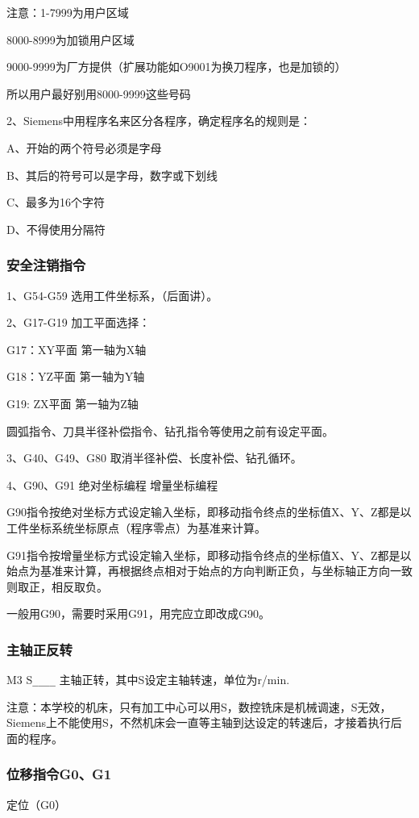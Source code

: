 注意：1-7999为用户区域

8000-8999为加锁用户区域

9000-9999为厂方提供（扩展功能如O9001为换刀程序，也是加锁的）

所以用户最好别用8000-9999这些号码

2、Siemens中用程序名来区分各程序，确定程序名的规则是：

A、开始的两个符号必须是字母

B、其后的符号可以是字母，数字或下划线

C、最多为16个字符

D、不得使用分隔符

\subsubsection{安全注销指令}
1、G54-G59  选用工件坐标系，（后面讲）。

2、G17-G19  加工平面选择：

G17：XY平面 第一轴为X轴

G18：YZ平面 第一轴为Y轴

G19: ZX平面 第一轴为Z轴

圆弧指令、刀具半径补偿指令、钻孔指令等使用之前有设定平面。

3、G40、G49、G80 取消半径补偿、长度补偿、钻孔循环。

4、G90、G91 绝对坐标编程 增量坐标编程

G90指令按绝对坐标方式设定输入坐标，即移动指令终点的坐标值X、Y、Z都是以工件坐标系统坐标原点（程序零点）为基准来计算。

G91指令按增量坐标方式设定输入坐标，即移动指令终点的坐标值X、Y、Z都是以始点为基准来计算，再根据终点相对于始点的方向判断正负，与坐标轴正方向一致则取正，相反取负。

一般用G90，需要时采用G91，用完应立即改成G90。

\subsubsection{主轴正反转}
M3 S\verb|____| 主轴正转，其中S设定主轴转速，单位为r/min.

注意：本学校的机床，只有加工中心可以用S，数控铣床是机械调速，S无效，Siemens上不能使用S，不然机床会一直等主轴到达设定的转速后，才接着执行后面的程序。

\subsubsection{位移指令G0、G1}
定位（G0）

